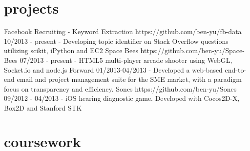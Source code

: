 \documentclass[]{friggeri-cv}
\begin{document}
\section{projects}

\begin{entrylist}
  \entry
    {Facebook Recruiting - Keyword Extraction}
    {https://github.com/ben-yu/fb-data}
    {10/2013 - present}
    {- Developing topic identifier on Stack Overflow questions utilizing scikit, iPython and EC2}
  \entry
    {Space Bees}
    {https://github.com/ben-yu/Space-Bees}
    {07/2013 - present}
    {- HTML5 multi-player arcade shooter using WebGL, Socket.io and node.js}
  \entry
    {Forward}
    {}
    {01/2013-04/2013}
    {- Developed a web-based end-to-end email and project management suite for the SME market, with a paradigm focus on transparency and efficiency.}
  \entry
    {Sones}
    {https://github.com/ben-yu/Sones}
    {09/2012 - 04/2013}
    {- iOS hearing diagnostic game. Developed with Cocos2D-X, Box2D and Stanford STK}
\end{entrylist}

\newpage

\section{coursework}
\end{document}
